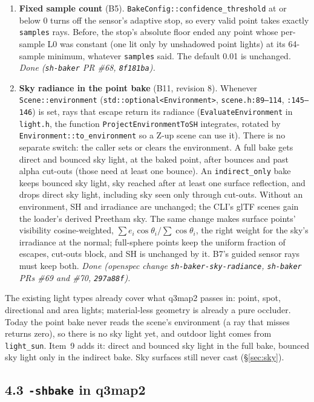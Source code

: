 \documentclass[11pt,a4paper]{article}
\begin{document}
\begin{enumerate}
  \emph{Done (\texttt{sh-baker} PR \#67, \texttt{fdad058}).}
\item \textbf{Fixed sample count} (B5). \texttt{BakeConfig::confidence\_threshold} at or below 0
  turns off the sensor's adaptive stop, so every valid point takes exactly \texttt{samples} rays.
  Before, the stop's absolute floor ended any point whose per-sample L0 was constant (one lit only
  by unshadowed point lights) at its 64-sample minimum, whatever \texttt{samples} said. The default
  0.01 is unchanged. \emph{Done (\texttt{sh-baker} PR \#68, \texttt{8f181ba}).}
\item \textbf{Sky radiance in the point bake} (B11, revision 8). Whenever
  \texttt{Scene::environment} (\texttt{std::optional<Environment>}, \texttt{scene.h:89--114},
  \texttt{:145--146}) is set, rays that escape return its radiance (\texttt{EvaluateEnvironment} in
  \texttt{light.h}, the function \texttt{ProjectEnvironmentToSH} integrates, rotated by
  \texttt{Environment::to\_environment} so a Z-up scene can use it). There is no separate switch:
  the caller sets or clears the environment. A full bake gets direct and bounced sky light, at the
  baked point, after bounces and past alpha cut-outs (those need at least one bounce). An
  \texttt{indirect\_only} bake keeps bounced sky light, sky reached after at least one surface
  reflection, and drops direct sky light, including sky seen only through cut-outs. Without an
  environment, SH and irradiance are unchanged; the CLI's glTF scenes gain the loader's derived
  Preetham sky. The same change makes surface points' visibility cosine-weighted,
  $\sum e_i\cos\theta_i / \sum\cos\theta_i$, the right weight for the sky's irradiance at the
  normal; full-sphere points keep the uniform fraction of escapes, cut-outs block, and SH is
  unchanged by it. B7's guided sensor rays must keep both. \emph{Done (openspec change
  \texttt{sh-baker-sky-radiance}, \texttt{sh-baker} PRs \#69 and \#70, \texttt{297a88f}).}
\end{enumerate}
The existing light types already cover what q3map2 passes in: point, spot, directional and area
lights; material-less geometry is already a pure occluder. Today the point bake never reads the
scene's environment (a ray that misses returns zero), so there is no sky light yet, and outdoor
light comes from \texttt{light\_sun}. Item~9 adds it: direct and bounced sky light in the full
bake, bounced sky light only in the indirect bake. Sky surfaces still never cast (§\ref{sec:sky}).

\subsection{4.3 \texttt{-shbake} in q3map2}
\end{document}

